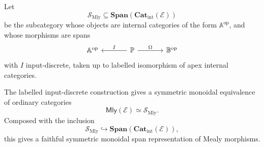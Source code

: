 \begin{definition}
\label{def:span-embedding-mealy}
Let
\[
\mathcal S_{\mathrm{Mly}}
\subseteq
\mathbf{Span}(\mathbf{Cat}_{\mathrm{int}}(\mathcal E))
\]
be the subcategory whose objects are internal categories of the form
\(\mathbb A^{\mathrm{op}}\), and whose morphisms are spans
\[
\begin{tikzcd}[column sep=large]
\mathbb A^{\mathrm{op}}
&
\mathbb P
  \arrow[l, "I"']
  \arrow[r, "\Omega"]
&
\mathbb B^{\mathrm{op}}
\end{tikzcd}
\]
with \(I\) input-discrete, taken up to labelled isomorphism of apex internal
categories.
\end{definition}

\begin{theorem}
\label{thm:mealy-as-span-subcategory}
The labelled input-discrete construction gives a symmetric monoidal
equivalence of ordinary categories
\[
\mathsf{Mly}(\mathcal E)
\simeq
\mathcal S_{\mathrm{Mly}}.
\]
Composed with the inclusion
\[
\mathcal S_{\mathrm{Mly}}
\hookrightarrow
\mathbf{Span}(\mathbf{Cat}_{\mathrm{int}}(\mathcal E)),
\]
this gives a faithful symmetric monoidal span representation of Mealy
morphisms.
\end{theorem}

